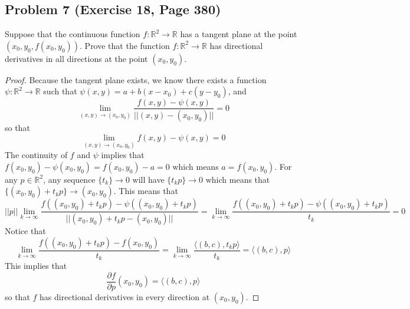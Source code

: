 \documentclass{article}
\begin{document}
\subsection*{Problem 7 (Exercise 18, Page 380)}
Suppose that the continuous function $f \colon \mathbb{R}^2 \to \mathbb{R}$ has a tangent plane at the point $(x_0, y_0, f(x_0, y_0))$. Prove that the function $f \colon \mathbb{R}^2 \to \mathbb{R}$ has directional derivatives in all directions at the point $(x_0, y_0)$.
\begin{proof}
Because the tangent plane exists, we know there exists a function $\psi \colon \mathbb{R}^2 \to \mathbb{R}$ such that $\psi(x, y) = a + b(x-x_0) + c(y-y_0)$, and
\[ \lim_{(x, y) \to (x_0, y_0)} \frac{f(x, y) - \psi(x, y)}{||(x, y) - (x_0, y_0)||} = 0\]
so that
\[ \lim_{(x, y) \to (x_0, y_0)} f(x, y) - \psi(x, y) = 0\]
The continuity of $f$ and $\psi$ implies that $f(x_0, y_0) - \psi(x_0, y_0) = f(x_0, y_0) - a = 0$ which means $a = f(x_0, y_0)$. For any $p \in \mathbb{R}^2$, any sequence $\{t_k\} \to 0$ will have $\{t_kp\} \to 0$ which  means that $\{(x_0, y_0) + t_kp\} \to (x_0, y_0)$. This means that 
\[ ||p|| \lim_{k \to \infty} \frac{f((x_0, y_0) + t_kp) - \psi((x_0, y_0) + t_kp)}{||(x_0, y_0) + t_kp - (x_0, y_0)||} = \lim_{k \to \infty} \frac{f((x_0, y_0) + t_kp) - \psi((x_0, y_0) + t_kp)}{t_k} = 0\]
Notice that 
\[ \lim_{k \to \infty} \frac{f((x_0, y_0) + t_kp) - f(x_0, y_0)}{t_k} = \lim_{k \to \infty} \frac{\langle (b, c), t_kp\rangle}{t_k} = \langle (b, c), p\rangle\]
This implies that
\[ \frac{\partial f}{\partial p}(x_0, y_0) =  \langle (b, c), p\rangle\]
so that $f$ has directional derivatives in every direction at $(x_0, y_0)$.
\end{proof}
\end{document}
